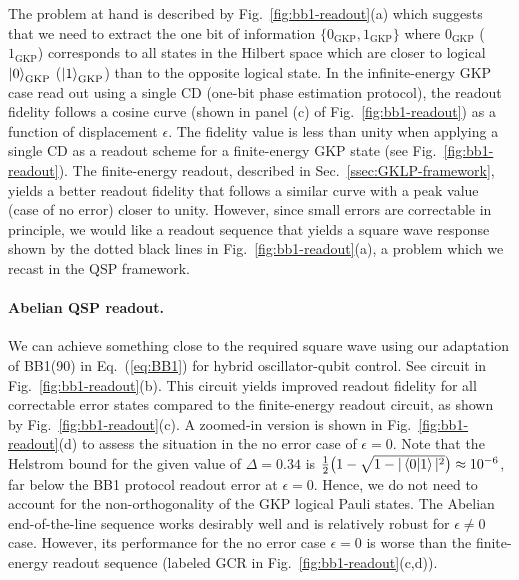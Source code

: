 \documentclass[aps,prx,showpacs,notitlepage,twocolumn,superscriptaddress,nofootinbib,preprintnumbers,floatfix,10pt, longbibliography]{revtex4-2}
\begin{document}
The problem at hand is described by Fig.~\ref{fig:bb1-readout}(a) which suggests that we need to extract the one bit of information $\{0_\mathrm{GKP},1_\mathrm{GKP}\}$ where $0_\mathrm{GKP}$ ($1_\mathrm{GKP}$) corresponds to all states in the Hilbert space which are closer to logical $\ket{0}_\mathrm{GKP}$ ($\ket{1}_\mathrm{GKP}$) than to the opposite logical state. In the infinite-energy GKP case read out using a single CD (one-bit phase estimation protocol), the readout fidelity follows a cosine curve (shown in panel (c) of Fig.~\ref{fig:bb1-readout}) as a function of displacement $\epsilon$. The fidelity value is less than unity when applying a single CD as a readout scheme for a finite-energy GKP state (see Fig.~\ref{fig:bb1-readout}). The finite-energy readout, described in Sec.~\ref{ssec:GKLP-framework}, yields a better readout fidelity that follows a similar curve with a peak value (case of no error) closer to unity. However, since small errors are correctable in principle, we would like a readout sequence that yields a square wave response shown by the dotted black lines in Fig.~\ref{fig:bb1-readout}(a), a problem which we recast in the QSP framework.

\paragraph{Abelian QSP readout.} We can achieve something close to the required square wave using our adaptation of BB1(90) in Eq.~(\ref{eq:BB1}) for hybrid oscillator-qubit control. See circuit in Fig.~\ref{fig:bb1-readout}(b). This circuit yields improved readout fidelity for all correctable error states compared to the finite-energy readout circuit, as shown by Fig.~\ref{fig:bb1-readout}(c). A zoomed-in version is shown in Fig.~\ref{fig:bb1-readout}(d) to assess the situation in the no error case of $\epsilon=0$. Note that the Helstrom bound for the given value of $\Delta=0.34$ is $\frac{1}{2}\big(1-\sqrt{1-|\braket{0|1}|^2}\big)\approx 10^{-6}$, far below the BB1 protocol readout error at $\epsilon=0$. Hence, we do not need to account for the non-orthogonality of the GKP logical Pauli states. The Abelian end-of-the-line sequence works desirably well and is relatively robust for $\epsilon\neq 0$ case. However, its performance for the no error case $\epsilon=0$ is worse than the finite-energy readout sequence (labeled GCR in Fig.~\ref{fig:bb1-readout}(c,d)).
\end{document}

